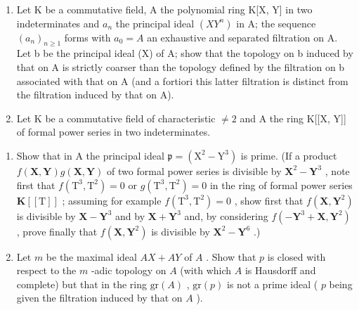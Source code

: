 
\begin{enumerate}
\def\labelenumi{\arabic{enumi}.}
\item
  Let K be a commutative field, A the polynomial ring K{[}X, Y{]} in two indeterminates and \(a_{n}\) the principal ideal \((XY^{n})\) in A; the sequence \((a_{n})_{n\geqslant1}\) forms with \(a_{0}=A\) an exhaustive and separated filtration on A. Let b be the principal ideal (X) of A; show that the topology on b induced by that on A is strictly coarser than the topology defined by the filtration on b associated with that on A (and a fortiori this latter filtration is distinct from the filtration induced by that on A).
\item
  Let K be a commutative field of characteristic \(\neq2\) and A the ring K{[}{[}X, Y{]}{]} of formal power series in two indeterminates.
\end{enumerate}

\begin{enumerate}
\def\labelenumi{(\alph{enumi})}
\item
  Show that in A the principal ideal \(\mathfrak{p} = (\mathrm{X}^2 -\mathrm{Y}^3)\) is prime. (If a product \(f(\mathbf{X},\mathbf{Y})g(\mathbf{X},\mathbf{Y})\) of two formal power series is divisible by \(\mathbf{X}^2 -\mathbf{Y}^3\) , note first that \(f(\mathrm{T}^3,\mathrm{T}^2) = 0\) or \(g(\mathrm{T}^3,\mathrm{T}^2) = 0\) in the ring of formal power series \(\mathbf{K}[[\mathrm{T}]]\) ; assuming for example \(f(\mathrm{T}^3,\mathrm{T}^2) = 0\) , show first that \(f(\mathbf{X},\mathbf{Y}^2)\) is divisible by \(\mathbf{X} - \mathbf{Y}^3\) and by \(\mathbf{X} + \mathbf{Y}^3\) and, by considering \(f(-\mathbf{Y}^3 +\mathbf{X},\mathbf{Y}^2)\) , prove finally that \(f(\mathbf{X},\mathbf{Y}^2)\) is divisible by \(\mathbf{X}^2 -\mathbf{Y}^6\) .)
\item
  Let \(m\) be the maximal ideal \(AX + AY\) of \(A\) . Show that \(p\) is closed with respect to the \(m\) -adic topology on \(A\) (with which \(A\) is Hausdorff and complete) but that in the ring \(\text{gr}(A)\) , \(\text{gr}(p)\) is not a prime ideal ( \(p\) being given the filtration induced by that on \(A\) ).
\end{enumerate}

